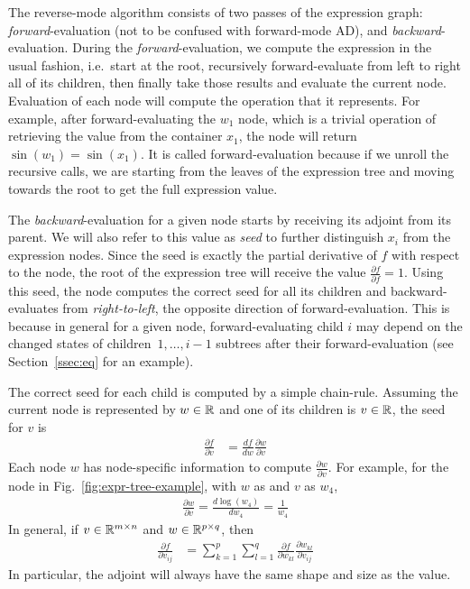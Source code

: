 The reverse-mode algorithm consists of two passes of the expression graph:
\emph{forward}-evaluation (not to be confused with forward-mode AD), 
and \emph{backward}-evaluation.
During the \emph{forward}-evaluation, we compute the expression in the usual fashion,
i.e.\ start at the root, recursively forward-evaluate from left to right all of its children,
then finally take those results and evaluate the current node.
Evaluation of each node will compute the operation that it represents.
For example, after forward-evaluating the $w_1$ node, 
which is a trivial operation of retrieving the value from the container $x_1$,
the  node will return~$\sin(w_1) = \sin(x_1)$.
It is called forward-evaluation because if we unroll the recursive calls,
we are starting from the leaves of the expression tree
and moving towards the root to get the full expression value.

The \emph{backward}-evaluation for a given node starts by receiving its adjoint from its parent.
We will also refer to this value as \emph{seed} to further distinguish $x_i$ from the expression nodes.
Since the seed is exactly the partial derivative of $f$ with respect to the node,
the root of the expression tree will receive the value $ \frac{\partial f}{\partial f} = 1$.
Using this seed, the node computes the correct seed for all its children and 
backward-evaluates from \emph{right-to-left}, the opposite direction of forward-evaluation.
This is because in general for a given node, forward-evaluating child $i$ may depend
on the changed states of children~$1,\ldots,i-1$ subtrees after their forward-evaluation
(see Section~\ref{ssec:eq} for an example).

The correct seed for each child is computed by a simple chain-rule.
Assuming the current node is represented by $w \in \mathbb{R}$ and one of its children is $v \in \mathbb{R}$,
the seed for $v$ is
\begin{align}
    \frac{\partial f}{\partial v} &=
    \frac{df}{dw} \frac{\partial w}{\partial v} \label{eq:next-seed}
\end{align}
Each node $w$ has node-specific information to compute $\frac{\partial w}{\partial v}$.
For example, for the  node in Fig.~\ref{fig:expr-tree-example},
with $w$ as  and $v$ as $w_4$,
\begin{align*}
    \frac{\partial w}{\partial v} = \frac{d\log(w_4)}{dw_4} = \frac{1}{w_4}
\end{align*}
In general, if $v \in \mathbb{R}^{m \times n}$ and $w \in \mathbb{R}^{p \times q}$, then
\begin{align*}
    \frac{\partial f}{\partial v_{ij}} &=
        \sum\limits_{k=1}^p \sum\limits_{l=1}^q 
        \frac{\partial f}{\partial w_{kl}} \frac{\partial w_{kl}}{\partial v_{ij}}
\end{align*}
In particular, the adjoint will always have the same shape and size as the value.

